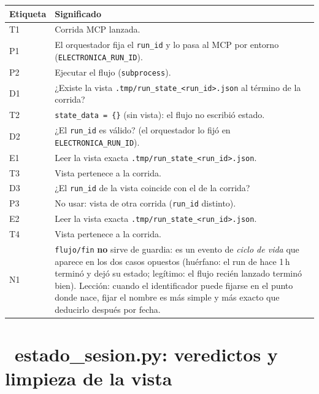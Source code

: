 \documentclass[11pt,a4paper]{article}
\newcommand{\iconotexto}[2]{\textcolor{cyanNeon}{\faIcon{#1}}~#2}
\begin{document}
\begin{center}
\vspace{6pt}
\begin{tcolorbox}[cajaContenido, title={\faIcon{table}~Leyenda de etiquetas}]
\small
\begin{tabularx}{\linewidth}{@{}>{\centering\arraybackslash}p{1.4cm}X@{}}
\toprule
\textbf{Etiqueta} & \textbf{Significado} \\ \midrule
T1 & Corrida MCP lanzada. \\
P1 & El orquestador fija el \texttt{run\_id} y lo pasa al MCP por entorno (\texttt{ELECTRONICA\_RUN\_ID}). \\
P2 & Ejecutar el flujo (\texttt{subprocess}). \\
D1 & ¿Existe la vista \texttt{.tmp/run\_state\_<run\_id>.json} al término de la corrida? \\
T2 & \texttt{state\_data = \{\}} (sin vista): el flujo no escribió estado. \\
D2 & ¿El \texttt{run\_id} es válido? (el orquestador lo fijó en \texttt{ELECTRONICA\_RUN\_ID}). \\
E1 & Leer la vista exacta \texttt{.tmp/run\_state\_<run\_id>.json}. \\
T3 & Vista pertenece a la corrida. \\
D3 & ¿El \texttt{run\_id} de la vista coincide con el de la corrida? \\
P3 & No usar: vista de otra corrida (\texttt{run\_id} distinto). \\
E2 & Leer la vista exacta \texttt{.tmp/run\_state\_<run\_id>.json}. \\
T4 & Vista pertenece a la corrida. \\
N1 & \texttt{flujo/fin} \textbf{no} sirve de guardia: es un evento de \emph{ciclo de vida} que aparece en los dos casos opuestos (huérfano: el run de hace 1\,h terminó y dejó su estado; legítimo: el flujo recién lanzado terminó bien). Lección: cuando el identificador puede fijarse en el punto donde nace, fijar el nombre es más simple y más exacto que deducirlo después por fecha. \\
\bottomrule
\end{tabularx}
\end{tcolorbox}
\end{center}

\section{\iconotexto{stethoscope}{estado\_sesion.py: veredictos y limpieza de la vista}}
\end{document}
